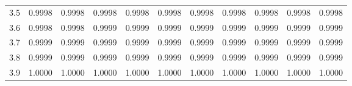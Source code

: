 \begin{table}[htbp]
\begin{tabular}{ccccccccccc}
		3.5  & 0.9998 & 0.9998 & 0.9998 & 0.9998 & 0.9998 & 0.9998 & 0.9998 & 0.9998 & 0.9998 & 0.9998 \\
		3.6  & 0.9998 & 0.9998 & 0.9999 & 0.9999 & 0.9999 & 0.9999 & 0.9999 & 0.9999 & 0.9999 & 0.9999 \\
		3.7  & 0.9999 & 0.9999 & 0.9999 & 0.9999 & 0.9999 & 0.9999 & 0.9999 & 0.9999 & 0.9999 & 0.9999 \\
		3.8  & 0.9999 & 0.9999 & 0.9999 & 0.9999 & 0.9999 & 0.9999 & 0.9999 & 0.9999 & 0.9999 & 0.9999 \\
		3.9  & 1.0000 & 1.0000 & 1.0000 & 1.0000 & 1.0000 & 1.0000 & 1.0000 & 1.0000 & 1.0000 & 1.0000 \\
		\hline
	\end{tabular}
\end{table}